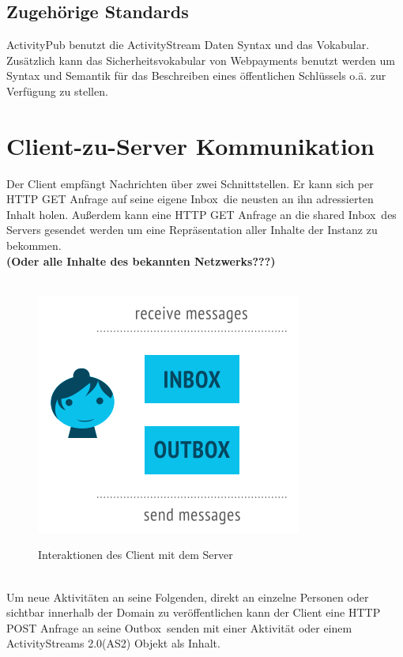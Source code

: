 	

\subsection{Zugehörige Standards}
	ActivityPub benutzt die ActivityStream Daten Syntax und das Vokabular. Zusätzlich kann das Sicherheitsvokabular von Webpayments benutzt werden um Syntax und Semantik für das Beschreiben eines öffentlichen Schlüssels o.ä. zur Verfügung zu stellen.

\section{Client-zu-Server Kommunikation}
	
	Der Client empfängt Nachrichten über zwei Schnittstellen. Er kann sich per HTTP GET Anfrage auf seine eigene \glqq Inbox\grqq~die neusten an ihn adressierten Inhalt holen. Außerdem kann eine HTTP GET Anfrage an die \glqq shared Inbox\grqq~des Servers gesendet werden um eine Repräsentation aller Inhalte der Instanz zu bekommen.\\ \textbf{(Oder alle Inhalte des bekannten Netzwerks???)}\\\\
	\begin{figure}[h]
		\centering
		\includegraphics[scale=0.6]{figures/inbox-outbox.png}
		\label{Client zu Server Interaktionen}
		\caption{Interaktionen des Client mit dem Server}
	\end{figure}\\
	Um neue Aktivitäten an seine Folgenden, direkt an einzelne Personen oder sichtbar innerhalb der Domain zu veröffentlichen kann der Client eine HTTP POST Anfrage an seine \glqq Outbox\grqq~senden mit einer Aktivität oder einem ActivityStreams 2.0(AS2) Objekt als Inhalt. 
	

